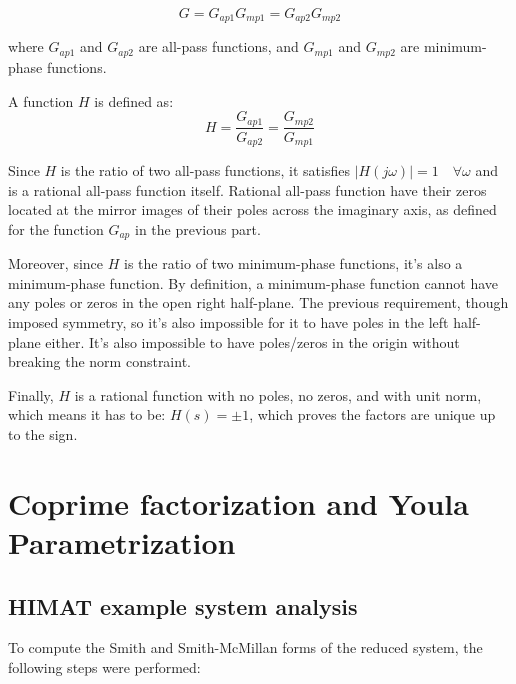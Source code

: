 \documentclass{scrreprt}
\begin{document}
\begin{equation}
    G = G_{ap1} G_{mp1} = G_{ap2} G_{mp2}    
\end{equation}

where $G_{ap1}$ and $G_{ap2}$ are all-pass functions, and $G_{mp1}$ and $G_{mp2}$ are minimum-phase functions. 

A function $H$ is defined as:
\begin{equation}
    H = \frac{G_{ap1}}{G_{ap2}} = \frac{G_{mp2}}{G_{mp1}}
\end{equation}

Since $H$ is the ratio of two all-pass functions, it satisfies $|H(j\omega)| = 1\quad \forall\omega$ and is a rational all-pass function itself. Rational all-pass function have their zeros located at the mirror images of their poles across the imaginary axis, as defined for the function $G_{ap}$ in the previous part.

Moreover, since $H$ is the ratio of two minimum-phase functions, it's also a minimum-phase function. By definition, a minimum-phase function cannot have any poles or zeros in the open right half-plane. The previous requirement, though imposed symmetry, so it's also impossible for it to have poles in the left half-plane either. It's also impossible to have poles/zeros in the origin without breaking the norm constraint.

Finally, $H$ is a rational function with no poles, no zeros, and with unit norm, which means it has to be: $H(s)=\pm1$, which proves the factors are unique up to the sign.



\chapter{Coprime factorization and Youla Parametrization}

\section{HIMAT example system analysis}
To compute the Smith and Smith-McMillan forms of the reduced system, the following steps were performed:
\end{document}
